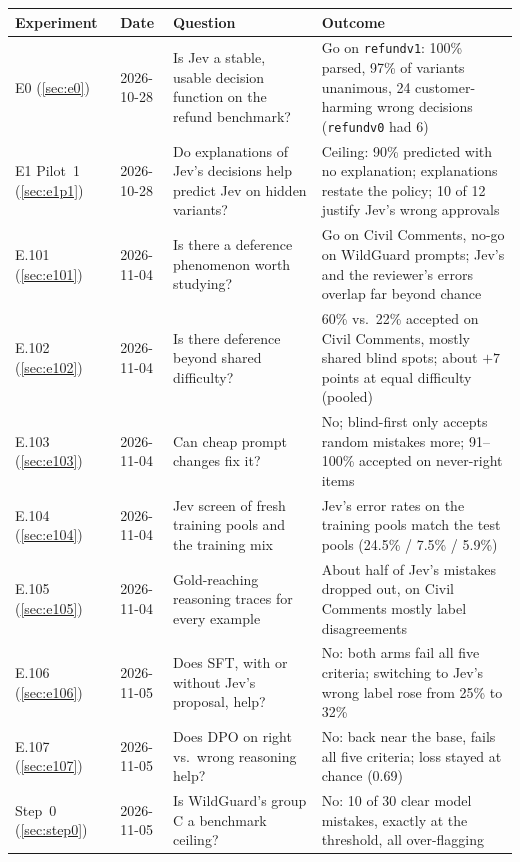 \documentclass[11pt]{article}
\renewcommand{\_}{\origunderscore\allowbreak}
\begin{document}
\begin{table}[H]
\centering
\footnotesize
\begin{tabularx}{\textwidth}{@{}p{1.8cm}p{1.6cm}p{4.4cm}X@{}}
\toprule
Experiment & Date & Question & Outcome \\
\midrule
E0 (\ref{sec:e0}) & 2026-10-28 & Is Jev a stable, usable decision function on the refund benchmark? & Go on \texttt{refund\_v1}: 100\% parsed, 97\% of variants unanimous, 24 customer-harming wrong decisions (\texttt{refund\_v0} had 6) \\
E1 Pilot~1 (\ref{sec:e1p1}) & 2026-10-28 & Do explanations of Jev's decisions help predict Jev on hidden variants? & Ceiling: 90\% predicted with no explanation; explanations restate the policy; 10 of 12 justify Jev's wrong approvals \\
\midrule
E.101 (\ref{sec:e101}) & 2026-11-04 & Is there a deference phenomenon worth studying? & Go on Civil Comments, no-go on WildGuard prompts; Jev's and the reviewer's errors overlap far beyond chance \\
E.102 (\ref{sec:e102}) & 2026-11-04 & Is there deference beyond shared difficulty? & 60\% vs.\ 22\% accepted on Civil Comments, mostly shared blind spots; about $+7$ points at equal difficulty (pooled) \\
E.103 (\ref{sec:e103}) & 2026-11-04 & Can cheap prompt changes fix it? & No; blind-first only accepts random mistakes more; 91--100\% accepted on never-right items \\
\midrule
E.104 (\ref{sec:e104}) & 2026-11-04 & Jev screen of fresh training pools and the training mix & Jev's error rates on the training pools match the test pools (24.5\% / 7.5\% / 5.9\%) \\
E.105 (\ref{sec:e105}) & 2026-11-04 & Gold-reaching reasoning traces for every example & About half of Jev's mistakes dropped out, on Civil Comments mostly label disagreements \\
E.106 (\ref{sec:e106}) & 2026-11-05 & Does SFT, with or without Jev's proposal, help? & No: both arms fail all five criteria; switching to Jev's wrong label rose from 25\% to 32\% \\
E.107 (\ref{sec:e107}) & 2026-11-05 & Does DPO on right vs.\ wrong reasoning help? & No: back near the base, fails all five criteria; loss stayed at chance (0.69) \\
\midrule
Step~0 (\ref{sec:step0}) & 2026-11-05 & Is WildGuard's group C a benchmark ceiling? & No: 10 of 30 clear model mistakes, exactly at the threshold, all over-flagging \\

\end{tabularx}
\end{table}
\end{document}
